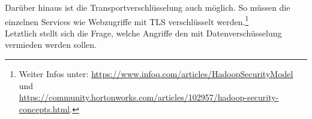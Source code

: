 \noindent
Darüber hinaus ist die Transportverschlüsselung auch möglich. So müssen die einzelnen Services wie Webzugriffe  mit TLS verschlüsselt werden.\footnote{Weiter Infos unter: \url{https://www.infoq.com/articles/HadoopSecurityModel} und\\ \url{https://community.hortonworks.com/articles/102957/hadoop-security-concepts.html}.}\\


\noindent
Letztlich stellt sich die Frage, welche Angriffe den mit Datenverschüsselung vermieden werden sollen. 